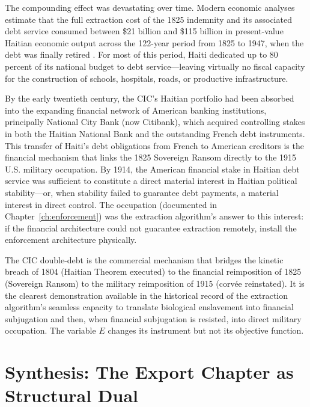 The compounding effect was devastating over time. Modern economic analyses estimate that the full extraction cost of the 1825 indemnity and its associated debt service consumed between \$21 billion and \$115 billion in present-value Haitian economic output across the 122-year period from 1825 to 1947, when the debt was finally retired \cite{nyt_ransom2022}. For most of this period, Haiti dedicated up to 80 percent of its national budget to debt service---leaving virtually no fiscal capacity for the construction of schools, hospitals, roads, or productive infrastructure.

By the early twentieth century, the CIC's Haitian portfolio had been absorbed into the expanding financial network of American banking institutions, principally National City Bank (now Citibank), which acquired controlling stakes in both the Haitian National Bank and the outstanding French debt instruments. This transfer of Haiti's debt obligations from French to American creditors is the financial mechanism that links the 1825 Sovereign Ransom directly to the 1915 U.S. military occupation. By 1914, the American financial stake in Haitian debt service was sufficient to constitute a direct material interest in Haitian political stability---or, when stability failed to guarantee debt payments, a material interest in direct control. The occupation (documented in Chapter~\ref{ch:enforcement}) was the extraction algorithm's answer to this interest: if the financial architecture could not guarantee extraction remotely, install the enforcement architecture physically.

The CIC double-debt is the commercial mechanism that bridges the kinetic breach of 1804 (Haitian Theorem executed) to the financial reimposition of 1825 (Sovereign Ransom) to the military reimposition of 1915 (corvée reinstated). It is the clearest demonstration available in the historical record of the extraction algorithm's seamless capacity to translate biological enslavement into financial subjugation and then, when financial subjugation is resisted, into direct military occupation. The variable $E$ changes its instrument but not its objective function.

\section{Synthesis: The Export Chapter as Structural Dual}
\label{sec:haitian_export_synthesis}

